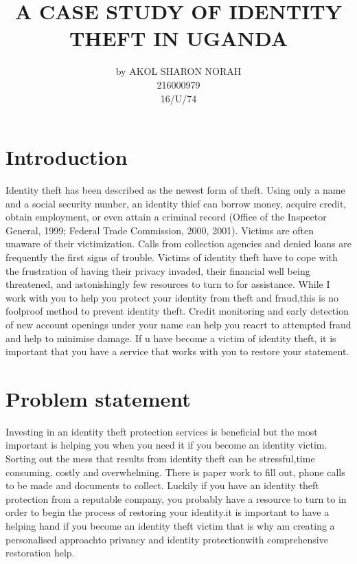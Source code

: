 \documentclass[10pt,letterpaper]{article}
\begin{document}
\title{ 
A CASE STUDY OF IDENTITY THEFT IN UGANDA
}
\author{by AKOL SHARON NORAH  \\ 216000979 \\ 16/U/74}
\maketitle
\section{Introduction }
Identity theft has been described as the newest form of theft. Using only a name
and a social security number, an identity thief can borrow money, acquire credit, obtain
employment, or even attain a criminal record (Office of the Inspector General, 1999;
Federal Trade Commission, 2000, 2001). Victims are often unaware of their
victimization. Calls from collection agencies and denied loans are frequently the first
signs of trouble. Victims of identity theft have to cope with the frustration of having their
privacy invaded, their financial well being threatened, and astonishingly few resources to
turn to for assistance. While I work with you to help you protect your identity from theft and fraud,this is no foolproof method to prevent identity theft. Credit monitoring and early detection of new account openings under your name can help you reacrt to attempted fraud and help to minimise damage. If u have become a victim of identity theft, it is important that you have a service that works with you to restore your statement.


\section{Problem statement }
Investing in an identity theft protection services is beneficial but the most important is helping you when you need it if you become an identity victim. Sorting out the mess that results from identity theft can be stressful,time consuming, costly and overwhelming. There is paper work to fill out, phone calls to be made and documents to collect. Luckily if you have an identity theft protection from a reputable company, you probably have a resource to turn to in order to begin the process of restoring your identity.it is important to have a helping hand if you become an identity theft victim that is why am creating a personalised approachto privancy and identity protectionwith comprehensive restoration help.
\end{document}
